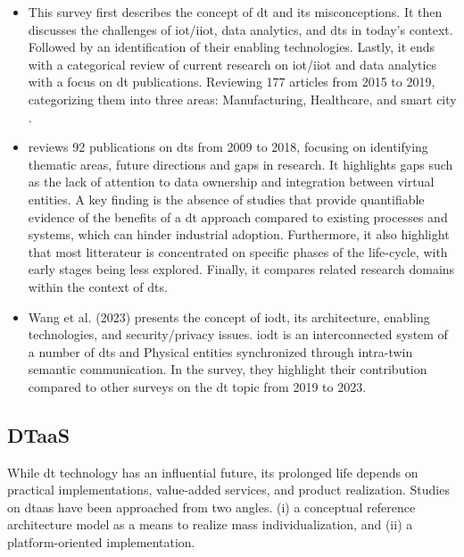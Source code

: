 \begin{itemize}
    \item This survey first describes the concept of \ac{dt} and its misconceptions.
      It then discusses the challenges of \ac{iot}/\ac{iiot}, data analytics, and \ac{dt}s in today's context.
      Followed by an identification of their enabling technologies.
      Lastly, it ends with a categorical review of current research on \ac{iot}/\ac{iiot} and data analytics with a focus on \ac{dt} publications.
      Reviewing 177 articles from 2015 to 2019, categorizing them into three areas: Manufacturing, Healthcare, and smart city \cite{Fuller9103025}.
    \item \cite{JONES202036} reviews 92 publications on \ac{dt}s from 2009 to 2018, focusing on identifying thematic areas, future directions and gaps in research.
      It highlights gaps such as the lack of attention to data ownership and integration between virtual entities.
      A key finding is the absence of studies that provide quantifiable evidence of the benefits of a \ac{dt} approach compared to existing processes and systems, which can hinder industrial adoption.
      Furthermore, it also highlight that most litterateur is concentrated on specific phases of the life-cycle, with early stages being less explored.
      Finally, it compares related research domains within the context of \ac{dt}s.
    \item Wang et al. (2023) \cite{Wang10090432} presents the concept of \ac{iodt}, its architecture, enabling technologies, and security/privacy issues.
      \ac{iodt} is an interconnected system of a number of \ac{dt}s and Physical entities synchronized through intra-twin semantic communication.
      In the survey, they highlight their contribution compared to other surveys on the \ac{dt} topic from 2019 to 2023. 
\end{itemize}

\subsection{DTaaS}
While \ac{dt} technology has an influential future, its prolonged life depends on practical implementations, value-added services, and product realization.
Studies on \ac{dtaas} have been approached from two angles.
(i) a conceptual reference architecture model as a means to realize mass individualization, and (ii) a platform-oriented implementation.

